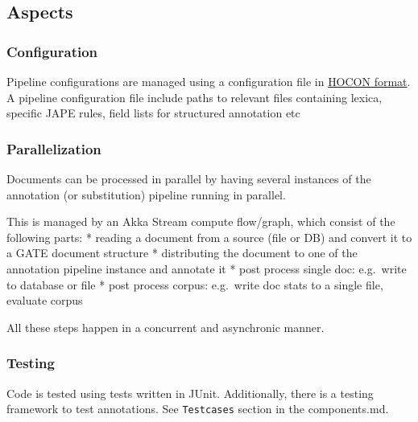 \subsection{Aspects}\label{aspects}

\subsubsection{Configuration}\label{configuration}

Pipeline configurations are managed using a configuration file in
\href{https://github.com/lightbend/config}{HOCON format}. A pipeline
configuration file include paths to relevant files containing lexica,
specific JAPE rules, field lists for structured annotation etc

\subsubsection{Parallelization}\label{parallelization}

Documents can be processed in parallel by having several instances of
the annotation (or substitution) pipeline running in parallel.

This is managed by an Akka Stream compute flow/graph, which consist of
the following parts: * reading a document from a source (file or DB) and
convert it to a GATE document structure * distributing the document to
one of the annotation pipeline instance and annotate it * post process
single doc: e.g.~write to database or file * post process corpus:
e.g.~write doc stats to a single file, evaluate corpus

All these steps happen in a concurrent and asynchronic manner.

\subsubsection{Testing}\label{testing}

Code is tested using tests written in JUnit. Additionally, there is a
testing framework to test annotations. See \texttt{Testcases} section in
the components.md.
